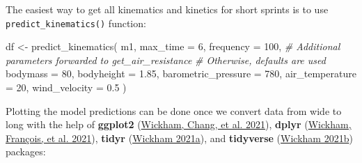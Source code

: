 \documentclass[fleqn,10pt]{wlpeerj} %
\newenvironment{Shaded}{\begin{snugshade}}{\end{snugshade}}
\newcommand{\AttributeTok}[1]{\textcolor[rgb]{0.77,0.63,0.00}{#1}}
\newcommand{\CommentTok}[1]{\textcolor[rgb]{0.56,0.35,0.01}{\textit{#1}}}
\newcommand{\DecValTok}[1]{\textcolor[rgb]{0.00,0.00,0.81}{#1}}
\newcommand{\FloatTok}[1]{\textcolor[rgb]{0.00,0.00,0.81}{#1}}
\newcommand{\FunctionTok}[1]{\textcolor[rgb]{0.00,0.00,0.00}{#1}}
\newcommand{\NormalTok}[1]{#1}
\newcommand{\OtherTok}[1]{\textcolor[rgb]{0.56,0.35,0.01}{#1}}
\newcommand{\SpecialCharTok}[1]{\textcolor[rgb]{0.00,0.00,0.00}{#1}}
\begin{document}
\small

\begin{Shaded}
\end{Shaded}

\normalsize

The easiest way to get all kinematics and kinetics for short sprints is to use \texttt{predict\_kinematics()} function:

\small

\begin{Shaded}
\begin{Highlighting}[]
\NormalTok{df }\OtherTok{\textless{}{-}} \FunctionTok{predict\_kinematics}\NormalTok{(}
\NormalTok{  m1,}
  \AttributeTok{max\_time =} \DecValTok{6}\NormalTok{,}
  \AttributeTok{frequency =} \DecValTok{100}\NormalTok{,}
  \CommentTok{\# Additional parameters forwarded to get\_air\_resistance}
  \CommentTok{\# Otherwise, defaults are used}
  \AttributeTok{bodymass =} \DecValTok{80}\NormalTok{,}
  \AttributeTok{bodyheight =} \FloatTok{1.85}\NormalTok{,}
  \AttributeTok{barometric\_pressure =} \DecValTok{780}\NormalTok{,}
  \AttributeTok{air\_temperature =} \DecValTok{20}\NormalTok{,}
  \AttributeTok{wind\_velocity =} \FloatTok{0.5}
\NormalTok{)}
\end{Highlighting}
\end{Shaded}

\normalsize

Plotting the model predictions can be done once we convert data from wide to long with the help of \textbf{ggplot2} (\protect\hyperlink{ref-R-ggplot2}{Wickham, Chang, et al. 2021}), \textbf{dplyr} (\protect\hyperlink{ref-R-dplyr}{Wickham, François, et al. 2021}), \textbf{tidyr} (\protect\hyperlink{ref-R-tidyr}{Wickham 2021a}), and \textbf{tidyverse} (\protect\hyperlink{ref-R-tidyverse}{Wickham 2021b}) packages:
\end{document}
